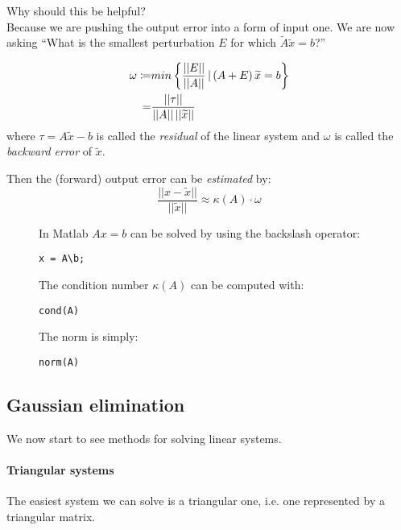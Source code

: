 {Why should this be helpful?\\
Because we are pushing the output error into a form of input one. We are now asking \enquote{What is the smallest perturbation $E$ for which $\tilde{A} \tilde{x} = b$?}
\begin{Teo}[Wilkinson]
	\begin{align*}
		\omega \coloneqq& min \left\{ \frac{||E||}{||A||} \,|\, (A + E)\,\widetilde{x} = b \right\}\\
		=& \frac{||\tau||}{||A||\,||\widetilde{x}||}
	\end{align*}
	where $\tau = A\tilde{x} - b$ is called the \emph{residual} of the linear system and $\omega$ is called the \emph{backward error} of $\tilde{x}$.
\end{Teo}
Then the (forward) output error can be \emph{estimated} by:
\begin{equation*}
	\frac{||x - \tilde{x}||}{||\tilde{x}||} \approx \kappa(A) \cdot \omega
\end{equation*}

\begin{figure}[H]
	\begin{matlabtip}
		\small{
		In Matlab $Ax = b$ can be solved by using the backslash operator:
		\begin{lstlisting}[aboveskip=1mm, belowskip=1.5mm]
			x = A\b;
		\end{lstlisting}
		The condition number $\kappa(A)$ can be computed with:
		\begin{lstlisting}[aboveskip=1mm, belowskip=1.5mm]
			cond(A)
		\end{lstlisting}
		The norm is simply:
		\begin{lstlisting}[aboveskip=1mm, belowskip=1.5mm]
			norm(A)
		\end{lstlisting}
		}
	\end{matlabtip}
\end{figure}

\subsection{Gaussian elimination}
We now start to see methods for solving linear systems.

\paragraph{Triangular systems}
The easiest system we can solve is a triangular one, i.e. one represented by a triangular matrix.

}
